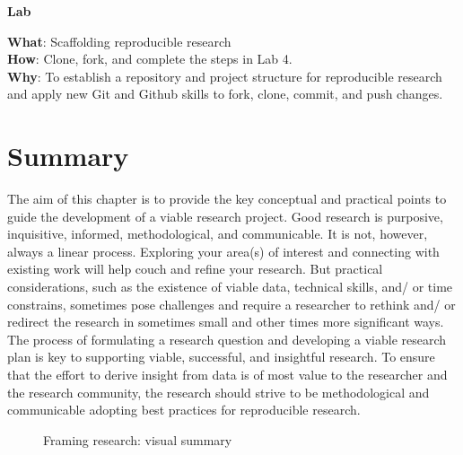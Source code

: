 \documentclass[
  letterpaper,
]{latex/krantz}
\theoremstyle{definition}
\theoremstyle{remark}
\begin{document}
\begin{tcolorbox}[enhanced jigsaw, colframe=quarto-callout-color-frame, breakable, bottomrule=.15mm, arc=.35mm, left=2mm, opacityback=0, rightrule=.15mm, colback=white, toprule=.15mm, leftrule=.75mm]

\textbf{ Lab}

\textbf{What}: Scaffolding reproducible research\\
\textbf{How}: Clone, fork, and complete the steps in Lab 4.\\
\textbf{Why}: To establish a repository and project structure for
reproducible research and apply new Git and Github skills to fork,
clone, commit, and push changes.

\end{tcolorbox}

\section*{Summary}\label{summary-3}


The aim of this chapter is to provide the key conceptual and practical
points to guide the development of a viable research project. Good
research is purposive, inquisitive, informed, methodological, and
communicable. It is not, however, always a linear process. Exploring
your area(s) of interest and connecting with existing work will help
couch and refine your research. But practical considerations, such as
the existence of viable data, technical skills, and/ or time constrains,
sometimes pose challenges and require a researcher to rethink and/ or
redirect the research in sometimes small and other times more
significant ways. The process of formulating a research question and
developing a viable research plan is key to supporting viable,
successful, and insightful research. To ensure that the effort to derive
insight from data is of most value to the researcher and the research
community, the research should strive to be methodological and
communicable adopting best practices for reproducible research.

\begin{figure}[H]


\caption{\label{fig-fr-visual-summary}Framing research: visual summary}

\end{figure}%
\end{document}
